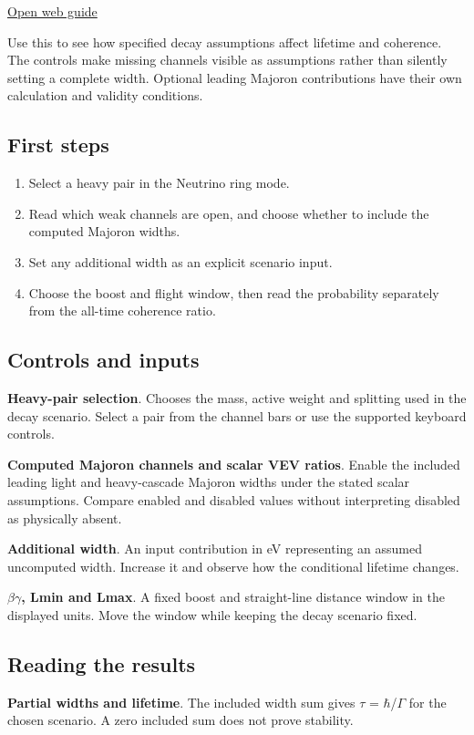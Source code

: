 \documentclass[11pt,a4paper]{article}
\begin{document}
\href{https://karlesmarin.github.io/ghu-explorer/guide/neutrino-decays/index.html}{Open web guide}

Use this to see how specified decay assumptions affect lifetime and coherence. The controls make missing channels visible as assumptions rather than silently setting a complete width. Optional leading Majoron contributions have their own calculation and validity conditions.
\subsection*{First steps}
\begin{enumerate}
\item Select a heavy pair in the Neutrino ring mode.
\item Read which weak channels are open, and choose whether to include the computed Majoron widths.
\item Set any additional width as an explicit scenario input.
\item Choose the boost and flight window, then read the probability separately from the all-time coherence ratio.
\end{enumerate}
\subsection*{Controls and inputs}
\textbf{Heavy-pair selection}. Chooses the mass, active weight and splitting used in the decay scenario. Select a pair from the channel bars or use the supported keyboard controls.

\textbf{Computed Majoron channels and scalar VEV ratios}. Enable the included leading light and heavy-cascade Majoron widths under the stated scalar assumptions. Compare enabled and disabled values without interpreting disabled as physically absent.

\textbf{Additional width}. An input contribution in eV representing an assumed uncomputed width. Increase it and observe how the conditional lifetime changes.

\textbf{\ensuremath{\beta}\ensuremath{\gamma}, Lmin and Lmax}. A fixed boost and straight-line distance window in the displayed units. Move the window while keeping the decay scenario fixed.

\subsection*{Reading the results}
\textbf{Partial widths and lifetime}. The included width sum gives \ensuremath{\tau} = \ensuremath{\hbar}/\ensuremath{\Gamma} for the chosen scenario. A zero included sum does not prove stability.
\end{document}
